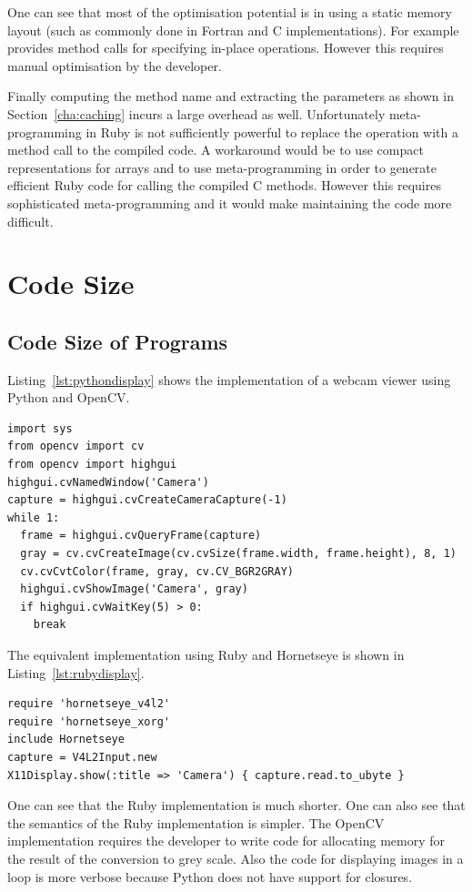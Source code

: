 \documentclass[12pt,a4paper,oneside,openright]{book}
\newcommand{\Eg}{For example }
\newcommand{\sct}[1]{Section~\ref{cha:#1}}
\newcommand{\lst}[1]{Listing~\ref{lst:#1}}
\begin{document}
\begin{CJK}{UTF8}{}
One can see that most of the optimisation potential is in using a static memory layout (such as commonly done in Fortran and C implementations). \Eg \citet{narray3} provides method calls for specifying in-place operations. However this requires manual optimisation by the developer.

Finally computing the method name and extracting the parameters as shown in \sct{caching} incurs a large overhead as well. Unfortunately meta-programming in Ruby is not sufficiently powerful to replace the operation with a method call to the compiled code. A workaround would be to use compact representations for arrays and to use meta-programming in order to generate efficient Ruby code for calling the compiled C methods. However this requires sophisticated meta-programming and it would make maintaining the code more difficult.

\section{Code Size}\label{cha:productivity}
\subsection{Code Size of Programs}
\lst{pythondisplay} shows the implementation of a webcam viewer using Python and OpenCV.
\lstset{language=Python,frame=single,numbers=left}
\begin{lstlisting}[float,caption={Webcam viewer implemented using Python and OpenCV},escapechar=\$,label=lst:pythondisplay]
import sys
from opencv import cv
from opencv import highgui
highgui.cvNamedWindow('Camera')
capture = highgui.cvCreateCameraCapture(-1)
while 1:
  frame = highgui.cvQueryFrame(capture)
  gray = cv.cvCreateImage(cv.cvSize(frame.width, frame.height), 8, 1)
  cv.cvCvtColor(frame, gray, cv.CV_BGR2GRAY)
  highgui.cvShowImage('Camera', gray)
  if highgui.cvWaitKey(5) > 0:
    break
\end{lstlisting}
The equivalent implementation using Ruby and Hornetseye is shown in \lst{rubydisplay}.
\lstset{language=Ruby,frame=single,numbers=left}
\begin{lstlisting}[float,caption={Webcam viewer implemented using Ruby and Hornetseye},escapechar=\$,label=lst:rubydisplay]
require 'hornetseye_v4l2'
require 'hornetseye_xorg'
include Hornetseye
capture = V4L2Input.new
X11Display.show(:title => 'Camera') { capture.read.to_ubyte }
\end{lstlisting}
One can see that the Ruby implementation is much shorter. One can also see that the semantics of the Ruby implementation is simpler. The OpenCV implementation requires the developer to write code for allocating memory for the result of the conversion to grey scale. Also the code for displaying images in a loop is more verbose because Python does not have support for closures.


\end{CJK}
\end{document}
